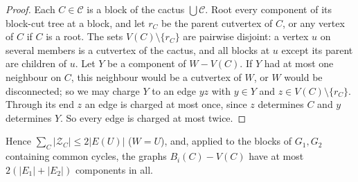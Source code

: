 \begin{proof}
Each $C\in\mathcal C$ is a block of the cactus $\bigcup\mathcal C$. Root
every component of its block-cut tree at a block, and let $r_C$ be the
parent cutvertex of $C$, or any vertex of $C$ if $C$ is a root. The sets
$V(C)\setminus\{r_C\}$ are pairwise disjoint: a vertex $u$ on several members
is a cutvertex of the cactus, and all blocks at $u$ except its parent are
children of $u$. Let $Y$ be a component of $W-V(C)$. If $Y$ had at most one
neighbour on $C$, this neighbour would be a cutvertex of $W$, or $W$ would be
disconnected; so we may charge $Y$ to an edge $yz$ with $y\in Y$ and $z\in
V(C)\setminus\{r_C\}$. Through its end $z$ an edge is charged at most once,
since $z$ determines $C$ and $y$ determines $Y$. So every edge is charged at
most twice.
\end{proof}

Hence $\sum_C|\mathcal Z_C|\le2|E(U)|$ ($W=U$), and, applied to the
blocks of $G_1,G_2$ containing common cycles, the graphs $B_i(C)-V(C)$ have
at most $2(|E_1|+|E_2|)$ components in all.
